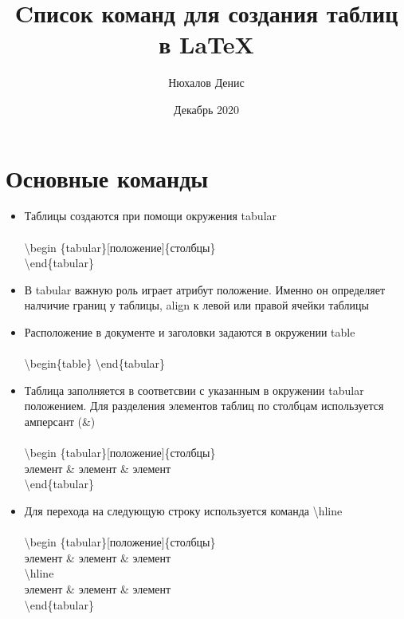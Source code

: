 \documentclass[a4paper,12pt]{article} %
\author{Нюхалов Денис}
\title{Cписок команд для создания таблиц в \LaTeX{}}
\date{Декабрь 2020}
\begin{document}

\maketitle
\newpage

\section{Основные команды}

\begin{itemize}
    \item Таблицы создаются при помощи окружения tabular\\\\
    \textbackslash begin \{tabular\}[положение]\{столбцы\}\\ \textbackslash end\{tabular\}
    \item В tabular важную роль играет атрибут положение. Именно он определяет налчичие границ у таблицы, align к левой или правой ячейки таблицы
    \item Расположение в документе и заголовки задаются в окружении table\\\\
    \textbackslash begin\{table\} \textbackslash end\{tabular\}
    \item Таблица заполняется в соответсвии с указанным в окружении tabular положением. Для разделения элементов таблиц по столбцам используется амперсант (\&)\\\\
    \textbackslash begin \{tabular\}[положение]\{столбцы\}\\
    элемент \& элемент \& элемент\\
    \textbackslash end\{tabular\}
    \item Для перехода на следующую строку используется команда \textbackslash hline \\\\
    \textbackslash begin \{tabular\}[положение]\{столбцы\}\\
    элемент \& элемент \& элемент\\
    \textbackslash hline\\
    элемент \& элемент \& элемент\\
    \textbackslash end\{tabular\}
    
\end{itemize}
\end{document}
